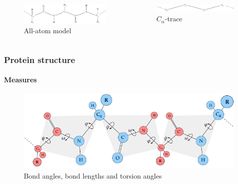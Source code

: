 \documentclass{beamer}
\begin{document}
\begin{frame}[t, fragile]
\begin{columns}
  \begin{figure}
    \centering
    \includegraphics[width=\textwidth]{../rapport/figures/amino_connect.pdf}
    \caption{All-atom model}
    \label{fig:front}
  \end{figure}

  \begin{figure}
    \centering
    \includegraphics[width=\textwidth]{../rapport/figures/Calpha_backbone.pdf}
    \caption{$C_\alpha$-trace}
    \label{fig:front}
  \end{figure}
  \end{columns}
\end{frame}

\begin{frame}[t, fragile]
  \frametitle{Protein structure}
  \framesubtitle{Measures}
  
  \vspace{0.5cm}

  \begin{figure}
    \centering
    \includegraphics[width=\textwidth]{../rapport/figures/protein-torsion-angles.pdf}
    \caption{Bond angles, bond lengths and torsion angles}
    \label{fig:front}
  \end{figure}

\end{frame}
\end{document}

